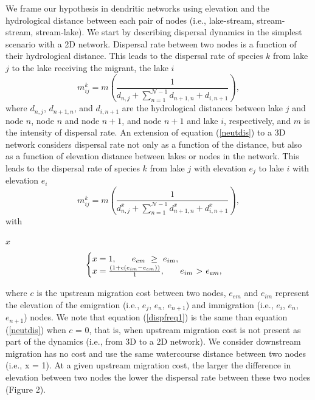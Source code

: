\documentclass[12pt]{article}
\begin{document}
We frame our hypothesis in dendritic networks using elevation and the
hydrological distance between each pair of nodes (i.e., lake-stream,
stream-stream, stream-lake). We start by describing dispersal dynamics in the simplest
scenario with a 2D network. Dispersal rate between two nodes is a
function of their hydrological distance. This leads to the dispersal
rate of species $k$ from lake $j$ to the lake receiving the migrant,
the lake $i$
\begin{equation}
m^{k}_{ij} = m \left(\frac{1}{d_{n,j} + \sum\limits_{n = 1}^{\mathcal{N}-1} d_{n+1,n}+ d_{i,n+1}}\right),
\label{neutdis}
\end{equation}
where $d_{n,j}$, $d_{n+1,n}$, and $d_{i,n+1}$ are the hydrological
distances between lake $j$ and node $n$, node $n$ and node $n+1$, and
node $n+1$ and lake $i$, respectively, and $m$ is the intensity of
dispersal rate. An extension of equation (\ref{neutdis}) to a 3D
network considers dispersal rate not only as a function of the
distance, but also as a function of elevation distance between lakes
or nodes in the network. This leads to the dispersal rate of species
$k$ from lake $j$ with elevation $e_{j}$ to lake $i$ with elevation
$e_{i}$
\begin{equation}
m^{k}_{ij} = m \left(\frac{1}{d_{n,j}^{x} + \sum\limits_{n = 1}^{\mathcal{N}-1} d_{n+1,n}^{x} + d_{i,n+1}^{x}}\right),
\label{dispfreq1}
\end{equation}
with
\begin{linenomath}
$x$
\begin{equation}
\begin{cases}
x = 1, \hspace{0.25 in} e_{em} \hspace{0.05 in} \geq \hspace{0.05 in} e_{im},\\
x = \frac{(1 + c(e_{im} - e_{em}))}{1}, \hspace{0.25 in} e_{im} \hspace{0.05 in} $>$ \hspace{0.05 in} e_{em},\\
\end{cases}
\end{equation}
\end{linenomath}
where $c$ is the upstream migration cost between two nodes, $e_{em}$
and $e_{im}$ represent the elevation of the emigration (i.e., $e_{j}$,
$e_{n}$, $e_{n+1}$) and immigration (i.e., $e_{i}$, $e_{n}$,
$e_{n+1}$) nodes. We note that equation (\ref{dispfreq1}) is the same
than equation (\ref{neutdis}) when $c$ = 0, that is, when upstream
migration cost is not present as part of the dynamics (i.e., from 3D
to a 2D network). We consider downstream migration has no cost and
use the same watercourse distance between two nodes (i.e., x = 1). At
a given upstream migration cost, the larger the difference in
elevation between two nodes the lower the dispersal rate between these
two nodes (Figure 2).
\end{document}
